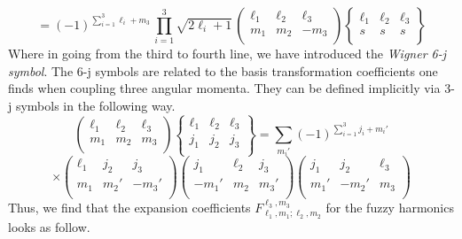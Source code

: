 %
%
\begin{equation}
=
(-1)^{\sum_{i=1}^3 \ell_i + m_3} \,
\prod_{i=1}^3 \sqrt{2 \ell_i + 1} \,
\left( \begin{array}{ccc}
\ell_1 & \ell_2 & \ell_3 \\
m_1 & m_2 & -m_3 \\
\end{array} \right)
\left\lbrace \begin{array}{ccc}
\ell_1 & \ell_2 & \ell_3 \\
s & s & s \\
\end{array} \right\rbrace
\end{equation}
%
%
Where in going from the third to fourth line, we have introduced the \textit{Wigner 6-j symbol}. The 6-j symbols are related to the basis transformation coefficients one finds when coupling three angular momenta. They can be defined implicitly via 3-j symbols in the following way.
%
%
\begin{equation*}
\left( \begin{array}{ccc}
\ell_1 & \ell_2 & \ell_3 \\
m_1 & m_2 & m_3 \\
\end{array} \right)
\left\lbrace \begin{array}{ccc}
\ell_1 & \ell_2 & \ell_3 \\
j_1 & j_2 & j_3 \\
\end{array} \right\rbrace
=
\sum_{m_i'}
(-1)^{\sum_{i=1}^3 j_i + m_i'}
\end{equation*}
%
%
\begin{equation}
\times
\left( \begin{array}{ccc}
\ell_1 & j_2 & j_3 \\
m_1 & m_2' & -m_3' \\
\end{array} \right)
\left( \begin{array}{ccc}
j_1 & \ell_2 & j_3 \\
-m_1' & m_2 & m_3' \\
\end{array} \right)
\left( \begin{array}{ccc}
j_1 & j_2 & \ell_3 \\
m_1' & -m_2' & m_3 \\
\end{array} \right)
\end{equation}
%
%
Thus, we find that the expansion coefficients $F^{\ell_3, m_3}_{\ell_1, m_1; \ell_2, m_2}$ for the fuzzy harmonics looks as follow.
